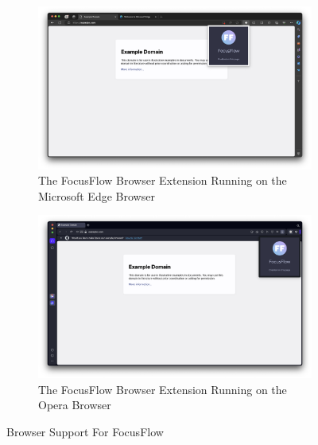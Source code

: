 \documentclass{report}
\begin{document}
\begin{figure}
    \begin{subfigure}[b]{0.45\textwidth}
        \centering
        \includegraphics[width=\textwidth]{../assets/FocusFlow-edge.png}
        \caption{The FocusFlow Browser Extension Running on the Microsoft Edge Browser}
    \end{subfigure}
    \hfill
    \begin{subfigure}[b]{0.45\textwidth}
        \centering
        \includegraphics[width=\textwidth]{../assets/FocusFlow-opera.png}
        \caption{The FocusFlow Browser Extension Running on the Opera Browser}
    \end{subfigure}
    \caption{Browser Support For FocusFlow}
    \label{fig:browser-support}
\end{figure}
\end{document}
